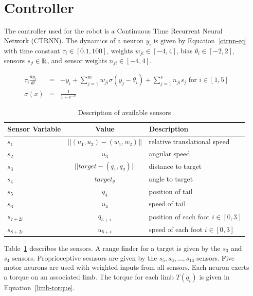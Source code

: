 \section{Controller}

The controller used for the robot is a Continuous Time Recurrent
Neural Network (CTRNN).  The dynamics of a neuron $y_i$ is given by
Equation~\ref{ctrnn-eq} with time constant $\tau_i \in [0.1, 100]$,
weights $w_{ji} \in [-4, 4]$, bias $\theta_i \in [-2, 2]$, sensors
$s_j \in \mathbb{R} $, and sensor weights $n_{ji} \in [-4, 4]$.

\begin{eqnarray}
  \tau_i \frac{d y_i}{dt} &=& -y_i + \sum_{j = 1}^m w_{ji} \sigma(y_j - \theta_i) + \sum_{j=1}^s n_{ji} s_j \text{ for } i \in [1,5] \label{ctrnn-eq} \\
  \sigma(x) &=& \frac{1}{1 + e^{-x}}
\end{eqnarray}

\begin{table}
  \begin{center}
    \begin{tabular}{ | l | c | l | }
      \hline
      Sensor Variable & Value & Description \\
      \hline
      $s_1$ & $||(u_1, u_2) - (w_1, w_2)||$ & relative translational speed \\
      $s_2$ & $u_3$ & angular speed \\
      $s_3$ & $||target - (q_1, q_2)||$ & distance to target \\ 
      $s_4$ & $target_\theta$ & angle to target \\              
      $s_5$ & $q_4$ & position of tail \\                       
      $s_6$ & $u_4$ & speed of tail \\                          
      $s_{7 + 2 i}$ & $q_{5 + i}$ & position of each foot $i \in [0, 3]$ \\        
      $s_{8 + 2 i}$ & $u_{5 + i}$ & speed of each foot $i \in [0, 3]$ \\           
      \hline
    \end{tabular}
  \end{center}
  \caption[Sensors]{\label{table:sensor}Description of available sensors}
\end{table}

Table~\ref{table:sensor} describes the sensors.  A range finder for a
target is given by the $s_3$ and $s_4$ sensors.  Proprioceptive
sesnsors are given by the $s_5, s_6, \ldots, s_{14}$ sensors.  Five
motor neurons are used with weighted inputs from all sensors.  Each
neuron exerts a torque on an associated limb.  The torque for each
limb $T(q_i)$ is given in Equation~\ref{limb-torque}.

